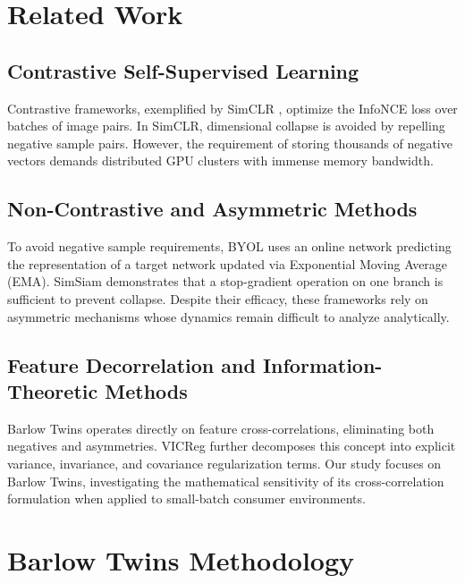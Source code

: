 \documentclass[conference]{IEEEtran}
\begin{document}
\section{Related Work}
\subsection{Contrastive Self-Supervised Learning}
Contrastive frameworks, exemplified by SimCLR \cite{chen2020simple}, optimize the InfoNCE loss over batches of image pairs. In SimCLR, dimensional collapse is avoided by repelling negative sample pairs. However, the requirement of storing thousands of negative vectors demands distributed GPU clusters with immense memory bandwidth.

\subsection{Non-Contrastive and Asymmetric Methods}
To avoid negative sample requirements, BYOL \cite{grill2020bootstrap} uses an online network predicting the representation of a target network updated via Exponential Moving Average (EMA). SimSiam \cite{chen2021exploring} demonstrates that a stop-gradient operation on one branch is sufficient to prevent collapse. Despite their efficacy, these frameworks rely on asymmetric mechanisms whose dynamics remain difficult to analyze analytically.

\subsection{Feature Decorrelation and Information-Theoretic Methods}
Barlow Twins \cite{zbontar2021barlow} operates directly on feature cross-correlations, eliminating both negatives and asymmetries. VICReg \cite{bardes2021vicreg} further decomposes this concept into explicit variance, invariance, and covariance regularization terms. Our study focuses on Barlow Twins, investigating the mathematical sensitivity of its cross-correlation formulation when applied to small-batch consumer environments.

\section{Barlow Twins Methodology}
\end{document}
